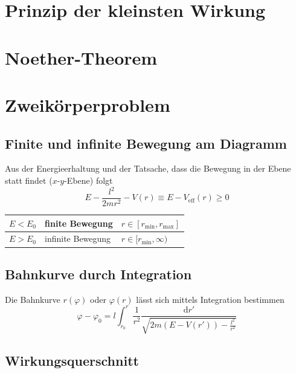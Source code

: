 \documentclass{article}
\newcommand{\diff}{\mathrm{d}}
\begin{document}
\newpage


\section{Prinzip der kleinsten Wirkung}


\newpage


\section{Noether-Theorem}


\newpage


\section{Zweikörperproblem}
\subsection{Finite und infinite Bewegung am Diagramm}
Aus der Energieerhaltung und der Tatsache, dass die Bewegung in der Ebene statt findet ($x$-$y$-Ebene) folgt
	\begin{equation}
		E - \frac{l^2}{2mr^2} - V(r) \equiv E - V_\text{eff}(r) \geq 0
	\end{equation}

\begin{table}[h]
	\centering
	\begin{tabular}{l|l|l}
		\hline\hline
			$E < E_0$ & finite Bewegung & $r\in [ r_\text{min}, r_\text{max} ]$ \\
		\hline
			$E > E_0$ & infinite Bewegung & $r\in [ r_\text{min}, \infty)$ \\
		\hline\hline
	\end{tabular}
\end{table}


\subsection{Bahnkurve durch Integration}
Die Bahnkurve $r(\varphi)$ oder $\varphi(r)$ lässt sich mittels Integration bestimmen
	\begin{equation}
		\varphi - \varphi_0 = l \int_{r_0}^r \frac{1}{r^2} \frac{\diff r'}{\sqrt{ 2m(E - V(r')) - \frac{l^2}{r^2} }}
	\end{equation}







\subsection{Wirkungsquerschnitt}
\end{document}

